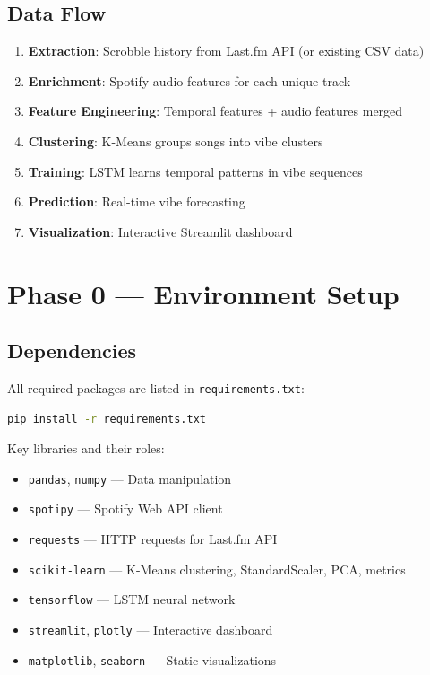 \documentclass[12pt, a4paper]{article}
\begin{document}
\subsection{Data Flow}
\begin{enumerate}
    \item \textbf{Extraction}: Scrobble history from Last.fm API (or existing CSV data)
    \item \textbf{Enrichment}: Spotify audio features for each unique track
    \item \textbf{Feature Engineering}: Temporal features + audio features merged
    \item \textbf{Clustering}: K-Means groups songs into vibe clusters
    \item \textbf{Training}: LSTM learns temporal patterns in vibe sequences
    \item \textbf{Prediction}: Real-time vibe forecasting
    \item \textbf{Visualization}: Interactive Streamlit dashboard
\end{enumerate}

\section{Phase 0 — Environment Setup}

\subsection{Dependencies}
All required packages are listed in \texttt{requirements.txt}:

\begin{lstlisting}[language=bash]
pip install -r requirements.txt
\end{lstlisting}

Key libraries and their roles:
\begin{itemize}
    \item \texttt{pandas}, \texttt{numpy} — Data manipulation
    \item \texttt{spotipy} — Spotify Web API client
    \item \texttt{requests} — HTTP requests for Last.fm API
    \item \texttt{scikit-learn} — K-Means clustering, StandardScaler, PCA, metrics
    \item \texttt{tensorflow} — LSTM neural network
    \item \texttt{streamlit}, \texttt{plotly} — Interactive dashboard
    \item \texttt{matplotlib}, \texttt{seaborn} — Static visualizations
\end{itemize}
\end{document}
